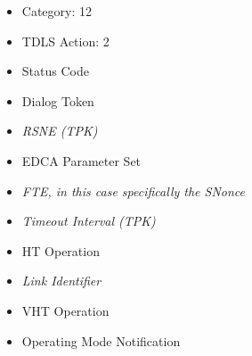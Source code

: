 \begin{itemize}
	\item Category: 12
	\item TDLS Action: 2
	\item Status Code
	\item Dialog Token
	\item \emph{RSNE (TPK)}
	\item EDCA Parameter Set
	\item \emph{FTE, in this case specifically the SNonce}
	\item \emph{Timeout Interval (TPK)}
	\item HT Operation
	\item \emph{Link Identifier}
	\item VHT Operation
	\item Operating Mode Notification
\end{itemize}
